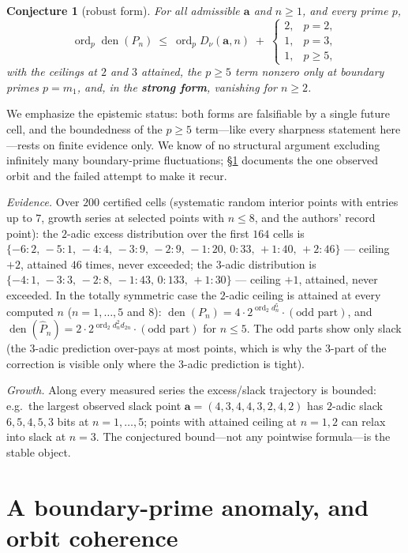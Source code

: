 \documentclass[11pt]{article}
\newtheorem{conjecture}[theorem]{Conjecture}
\theoremstyle{definition}
\newcommand{\dn}[1]{d_{#1}}
\newcommand{\Dnu}{D_{\nu}}
\newcommand{\ord}{\operatorname{ord}}
\newcommand{\den}{\operatorname{den}}
\begin{document}
\begin{conjecture}[robust form]\label{conj:main}
For all admissible $\mathbf a$ and $n\ge1$, and every prime $p$,
\[
\ord_p \den(P_n)\ \le\ \ord_p \Dnu(\mathbf a,n)\;+\;
\begin{cases} 2, & p=2,\\ 1, & p=3,\\ 1, & p\ge5,\end{cases}
\]
with the ceilings at $2$ and $3$ attained, the $p\ge5$ term nonzero only
at boundary primes $p=m_1$, and, in the \textbf{strong form}, vanishing
for $n\ge2$.
\end{conjecture}

We emphasize the epistemic status: both forms are falsifiable by a
single future cell, and the boundedness of the $p\ge5$ term---like every
sharpness statement here---rests on finite evidence only. We know of no
structural argument excluding infinitely many boundary-prime
fluctuations; \S\ref{sec:anomaly} documents the one observed orbit and
the failed attempt to make it recur.

\emph{Evidence.} Over $200$ certified cells (systematic random interior
points with entries up to $7$, growth series at selected points with
$n\le8$, and the authors' record point): the $2$-adic excess
distribution over the first $164$ cells is
$\{-6{:}2,\,-5{:}1,\,-4{:}4,\,-3{:}9,\,-2{:}9,\,-1{:}20,\,0{:}33,
\,+1{:}40,\,+2{:}46\}$ --- ceiling $+2$, attained $46$ times, never
exceeded; the $3$-adic distribution is
$\{-4{:}1,\,-3{:}3,\,-2{:}8,\,-1{:}43,\,0{:}133,\,+1{:}30\}$ ---
ceiling $+1$, attained, never exceeded. In the totally symmetric case
the $2$-adic ceiling is attained at every computed $n$
($n=1,\dots,5$ and $8$): $\den(P_n)=4\cdot 2^{\ord_2 \dn{n}^5}\cdot(\text{odd
part})$, and $\den(\hat P_n)=2\cdot2^{\ord_2 \dn{n}^2\dn{2n}}\cdot
(\text{odd part})$ for $n\le5$. The odd parts show only slack (the
$3$-adic prediction over-pays at most points, which is why the $3$-part
of the correction is visible only where the $3$-adic prediction is
tight).

\emph{Growth.} Along every measured series the excess/slack trajectory
is bounded: e.g.\ the largest observed slack point
$\mathbf a=(4,3,4,4,3,2,4,2)$ has $2$-adic slack
$6,5,4,5,3$ bits at $n=1,\dots,5$; points with attained ceiling at
$n=1,2$ can relax into slack at $n=3$. The conjectured bound---not any
pointwise formula---is the stable object.

\section{A boundary-prime anomaly, and orbit coherence}
\label{sec:anomaly}
\end{document}
